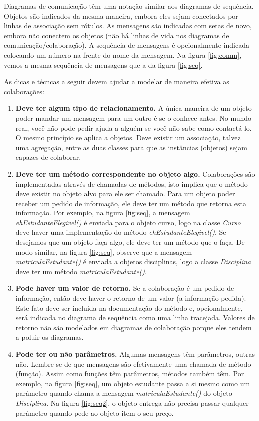 \documentclass[
	article,			%
	12pt,				%
	openright,
	twoside,			%
	a4paper,			%
	english,			%
	french,
	brazil,				%
	sumario=tradicional
	]{abntex2}
\begin{document}
Diagramas de comunicação têm uma notação similar aos diagramas de sequência. Objetos são indicados da mesma maneira, embora eles sejam conectados por linhas de associação sem rótulos. As mensagens são indicadas com setas de novo, embora não conectem os objetos (não há linhas de vida nos diagramas de comunicação/colaboração). A sequência de mensagens é opcionalmente indicada colocando um número na frente do nome da mensagem. Na figura \ref{fig:comm}, vemos a mesma sequência de mensagens que a da figura \ref{fig:seq}.

As dicas e técncas a seguir devem ajudar a modelar de maneira efetiva as colaborações:

\begin{enumerate}
\item \textbf{Deve ter algum tipo de relacionamento.} A única maneira de um objeto poder mandar um mensagem para um outro é se o conhece antes. No mundo real, você não pode pedir ajuda a alguém se você não sabe como contactá-lo. O mesmo princípio se aplica a objetos. Deve existir um associação, talvez uma agregação, entre as duas classes para que as instâncias (objetos) sejam capazes de colaborar.

\item \textbf{Deve ter um método correspondente no objeto algo.} Colaborações são implementadas através de chamadas de métodos, isto implica que o método deve existir no objeto alvo para ele ser chamado. Para um objeto poder receber um pedido de informação, ele deve ter um método que retorna esta informação. Por exemplo, na figura \ref{fig:seq}, a mensagem \emph{ehEstudanteElegivel()} é enviada para o objeto curso, logo na classe \emph{Curso} deve haver uma implementação do método \emph{ehEstudanteElegivel()}. Se desejamos que um objeto faça algo, ele deve ter um método que o faça. De modo similar, na figura \ref{fig:seq}, observe que a mensagem \emph{matriculaEstudante()} é enviada a objetos disciplinas, logo a classe \emph{Disciplina} deve ter um método \emph{matriculaEstudante()}.

\item \textbf{Pode haver um valor de retorno.} Se a colaboração é um pedido de informação, então deve haver o retorno de um valor (a informação pedida). Este fato deve ser incluida na documentação do método e, opcionalmente, será indicada no diagrama de sequência como uma linha tracejada. Valores de retorno não são modelados em diagramas de colaboração porque eles tendem a poluir os diagramas.

\item \textbf{Pode ter ou não parâmetros.} Algumas mensagens têm parâmetros, outras não. Lembre-se de que mensagens são efetivamente uma chamada de método (função). Assim como funções têm parâmetros, métodos também têm. Por exemplo, na figura \ref{fig:seq}, um objeto estudante passa a si mesmo como um parâmetro quando chama a mensagem \emph{matriculaEstudante()} do objeto \emph{Disciplina}. Na figura \ref{fig:seq2}, o objeto entrega não precisa passar qualquer parâmetro quando pede ao objeto item o seu preço.


\end{enumerate}
\end{document}
